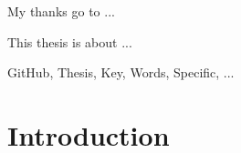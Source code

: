 \documentclass[11pt,final,oneside]{fithesis2}
\begin{document}
\FrontMatter
\ThesisTitlePage

\begin{ThesisDeclaration}
  \DeclarationText
  \AdvisorName
\end{ThesisDeclaration}

\begin{ThesisThanks}
My thanks go to ... 
\end{ThesisThanks}

\begin{ThesisAbstract}
This thesis is about ...
\end{ThesisAbstract}

\begin{ThesisKeyWords}
GitHub, Thesis, Key, Words, Specific, ...
\end{ThesisKeyWords}

\MainMatter

\tableofcontents

\chapter{Introduction}


%
%

\appendix

\end{document}

